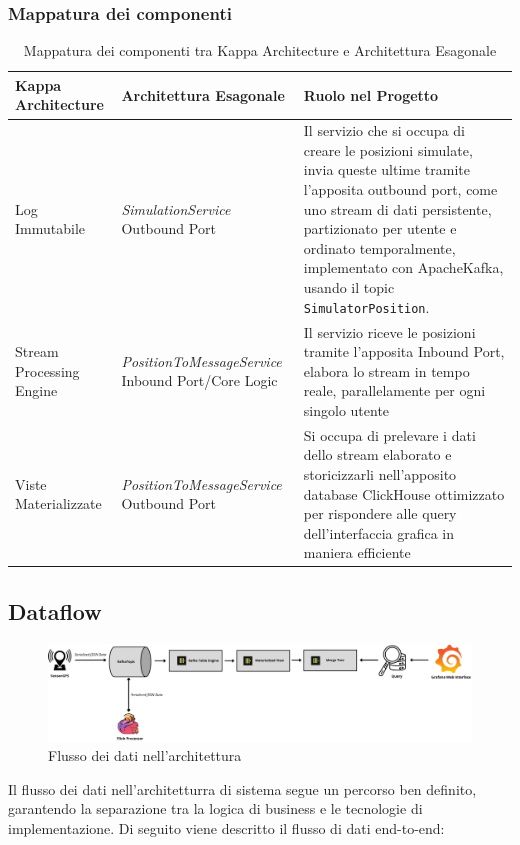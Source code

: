 \documentclass[10pt]{article}
\begin{document}
\subsubsection{Mappatura dei componenti}

\begin{table}[H]
\centering
\renewcommand{\arraystretch}{1.5}
\begin{tabular}{|>{\centering\arraybackslash}m{4cm}|>{\centering\arraybackslash}m{4cm}|>{\raggedright\arraybackslash}m{6cm}|}
\hline
\rowcolor{gray!25}
\textbf{Kappa Architecture} & \textbf{Architettura Esagonale} & \textbf{Ruolo nel Progetto} \\
\hline
Log Immutabile & \textit{SimulationService} Outbound Port & Il servizio che si occupa di creare le posizioni simulate, invia queste ultime tramite l'apposita outbound port, come uno stream di dati persistente, partizionato per utente e ordinato temporalmente, implementato con ApacheKafka, usando il topic \texttt{SimulatorPosition}. \\
\hline
Stream Processing Engine & \textit{PositionToMessageService} Inbound Port/Core Logic & Il servizio riceve le posizioni tramite l'apposita Inbound Port, elabora lo stream in tempo reale, parallelamente per ogni singolo utente\\
\hline
Viste Materializzate & \textit{PositionToMessageService} Outbound Port & Si occupa di prelevare i dati dello stream elaborato e storicizzarli nell'apposito database ClickHouse ottimizzato per rispondere alle query dell'interfaccia grafica in maniera efficiente\\
\hline
\end{tabular}
\caption{Mappatura dei componenti tra Kappa Architecture e Architettura Esagonale}
\label{tab:mappatura_componenti}
\end{table}



    \subsection{Dataflow}

    \begin{figure}[H]
        \centering
        \includegraphics[width=\textwidth]{Dataflow.pdf}
        \caption{Flusso dei dati nell'architettura}
    \end{figure}
    Il flusso dei dati nell'architetturra di sistema segue un percorso ben definito, garantendo la separazione tra la logica di business e le tecnologie di implementazione. Di seguito viene descritto il flusso di dati end-to-end:
    
\end{document}
